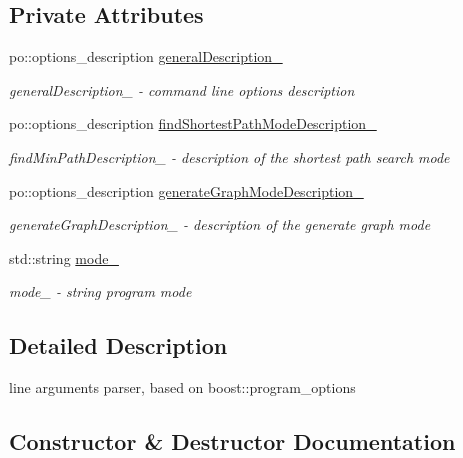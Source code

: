 \subsection*{Private Attributes}
\begin{DoxyCompactItemize}
\item 
po\+::options\+\_\+description \hyperlink{a00002_a1fa87430e08e605b208fd532e73ac236_a1fa87430e08e605b208fd532e73ac236}{general\+Description\+\_\+}
\begin{DoxyCompactList}\small\item\em general\+Description\+\_\+ -\/ command line options description \end{DoxyCompactList}\item 
po\+::options\+\_\+description \hyperlink{a00002_a6ed91e0b976c665765f35aa51fefba87_a6ed91e0b976c665765f35aa51fefba87}{find\+Shortest\+Path\+Mode\+Description\+\_\+}
\begin{DoxyCompactList}\small\item\em find\+Min\+Path\+Description\+\_\+ -\/ description of the shortest path search mode \end{DoxyCompactList}\item 
po\+::options\+\_\+description \hyperlink{a00002_aaa15954a88f93131e4c17223eafc11c5_aaa15954a88f93131e4c17223eafc11c5}{generate\+Graph\+Mode\+Description\+\_\+}
\begin{DoxyCompactList}\small\item\em generate\+Graph\+Description\+\_\+ -\/ description of the generate graph mode \end{DoxyCompactList}\item 
std\+::string \hyperlink{a00002_ad8127feed7d8312f07ef9a52f6e06f03_ad8127feed7d8312f07ef9a52f6e06f03}{mode\+\_\+}
\begin{DoxyCompactList}\small\item\em mode\+\_\+ -\/ string program mode \end{DoxyCompactList}\end{DoxyCompactItemize}


\subsection{Detailed Description}
line arguments parser, based on boost\+::program\+\_\+options 

\subsection{Constructor \& Destructor Documentation}
